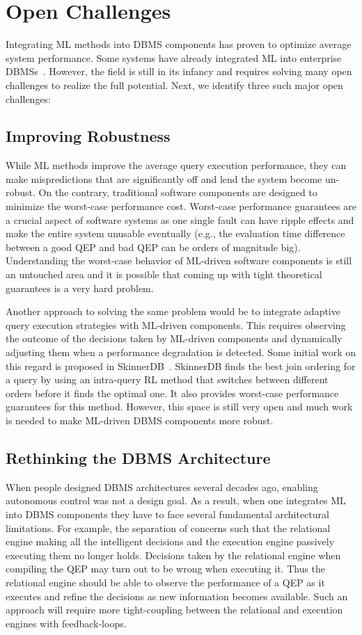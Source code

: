 \section{Open Challenges}
Integrating ML methods into DBMS components has proven to optimize average system performance.
Some systems have already integrated ML into enterprise DBMSs~\cite{leo, cardlearner, verdict}.
However, the field is still in its infancy and requires solving many open challenges to realize the full potential.
Next, we identify three such major open challenges:


\subsection{Improving Robustness} While ML methods improve the average query execution performance, they can make mispredictions that are significantly off and lend the system become un-robust.
On the contrary, traditional software components are designed to minimize the worst-case performance cost.
Worst-case performance guarantees are a crucial aspect of software systems as one single fault can have ripple effects and make the entire system unusable eventually (e.g., the evaluation time difference between a good QEP and bad QEP can be orders of magnitude big).
Understanding the worst-case behavior of ML-driven software components is still an untouched area and it is possible that coming up with tight theoretical guarantees is a very hard problem.
 
Another approach to solving the same problem would be to integrate adaptive query execution strategies with ML-driven components.
This requires observing the outcome of the decisions taken by ML-driven components and dynamically adjusting them when a performance degradation is detected.
Some initial work on this regard is proposed in SkinnerDB~\cite{skinnerdb}.
SkinnerDB finds the best join ordering for a query by using an intra-query RL method that switches between different orders before it finds the optimal one.
It also provides worst-case performance guarantees for this method.
However, this space is still very open and much work is needed to make ML-driven DBMS components more robust.


\subsection{Rethinking the DBMS Architecture} When people designed DBMS architectures several decades ago, enabling autonomous control was not a design goal.
As a result, when one integrates ML into DBMS components they have to face several fundamental architectural limitations.
For example, the separation of concerns such that the relational engine making all the intelligent decisions and the execution engine passively executing them no longer holds.
Decisions taken by the relational engine when compiling the QEP may turn out to be wrong when executing it.
Thus the relational engine should be able to observe the performance of a QEP as it executes and refine the decisions as new information becomes available.
Such an approach will require more tight-coupling between the relational and execution engines with feedback-loops.

